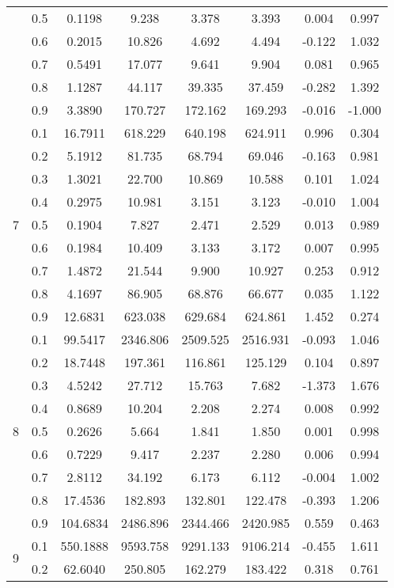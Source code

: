 \documentclass[11pt,a4paper]{report}
\begin{document}
\begin{longtable}{ | c | c || c | c | c | c | c | c | }
 & 0.5 & 0.1198 & 9.238 & 3.378 & 3.393 & 0.004 & 0.997 \\
 & 0.6 & 0.2015 & 10.826 & 4.692 & 4.494 & -0.122 & 1.032 \\
 & 0.7 & 0.5491 & 17.077 & 9.641 & 9.904 & 0.081 & 0.965 \\
 & 0.8 & 1.1287 & 44.117 & 39.335 & 37.459 & -0.282 & 1.392 \\
 & 0.9 & 3.3890 & 170.727 & 172.162 & 169.293 & -0.016 & -1.000 \\
 \hline
\multirow{9}{*}{7} & 0.1 & 16.7911 & 618.229 & 640.198 & 624.911 & 0.996 & 0.304 \\
 & 0.2 & 5.1912 & 81.735 & 68.794 & 69.046 & -0.163 & 0.981 \\
 & 0.3 & 1.3021 & 22.700 & 10.869 & 10.588 & 0.101 & 1.024 \\
 & 0.4 & 0.2975 & 10.981 & 3.151 & 3.123 & -0.010 & 1.004 \\
 & 0.5 & 0.1904 & 7.827 & 2.471 & 2.529 & 0.013 & 0.989 \\
 & 0.6 & 0.1984 & 10.409 & 3.133 & 3.172 & 0.007 & 0.995 \\
 & 0.7 & 1.4872 & 21.544 & 9.900 & 10.927 & 0.253 & 0.912 \\
 & 0.8 & 4.1697 & 86.905 & 68.876 & 66.677 & 0.035 & 1.122 \\
 & 0.9 & 12.6831 & 623.038 & 629.684 & 624.861 & 1.452 & 0.274 \\
 \hline
\multirow{9}{*}{8} & 0.1 & 99.5417 & 2346.806 & 2509.525 & 2516.931 & -0.093 & 1.046 \\
 & 0.2 & 18.7448 & 197.361 & 116.861 & 125.129 & 0.104 & 0.897 \\
 & 0.3 & 4.5242 & 27.712 & 15.763 & 7.682 & -1.373 & 1.676 \\
 & 0.4 & 0.8689 & 10.204 & 2.208 & 2.274 & 0.008 & 0.992 \\
 & 0.5 & 0.2626 & 5.664 & 1.841 & 1.850 & 0.001 & 0.998 \\
 & 0.6 & 0.7229 & 9.417 & 2.237 & 2.280 & 0.006 & 0.994 \\
 & 0.7 & 2.8112 & 34.192 & 6.173 & 6.112 & -0.004 & 1.002 \\
 & 0.8 & 17.4536 & 182.893 & 132.801 & 122.478 & -0.393 & 1.206 \\
 & 0.9 & 104.6834 & 2486.896 & 2344.466 & 2420.985 & 0.559 & 0.463 \\
 \hline
\multirow{9}{*}{9} & 0.1 & 550.1888 & 9593.758 & 9291.133 & 9106.214 & -0.455 & 1.611 \\
 & 0.2 & 62.6040 & 250.805 & 162.279 & 183.422 & 0.318 & 0.761 \\

\end{longtable}
\end{document}
